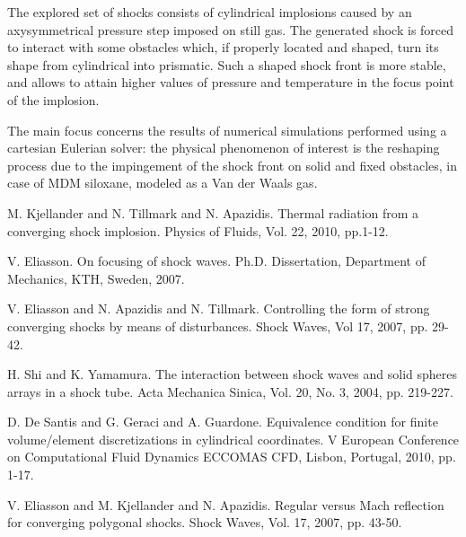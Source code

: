 \documentclass[article, A4, 11pt]{llncs}%
\begin{document}
The explored set of shocks consists of cylindrical implosions caused by an axysymmetrical pressure step imposed on still gas. The generated shock is forced to interact with some obstacles which, if properly located and shaped, turn its shape from cylindrical into prismatic. Such a shaped shock front is more stable, and allows to attain higher values of pressure and temperature in the focus point of the implosion.

The main focus concerns the results of numerical simulations performed using a cartesian Eulerian solver: the physical phenomenon of interest is the  reshaping process due to the impingement of the shock front on solid and fixed obstacles, in case of MDM siloxane, modeled as a Van der Waals gas.


\begin{thebibliography}{10}
{\sc M. Kjellander and N. Tillmark and N. Apazidis}. {Thermal radiation from a converging shock implosion}. Physics of Fluids, Vol. 22, 2010, pp.1-12.

{\sc V. Eliasson}. {On focusing of shock waves}. Ph.D. Dissertation, Department of Mechanics, KTH, Sweden, 2007.

{\sc V. Eliasson and N. Apazidis and N. Tillmark}. {Controlling the form of strong converging shocks by means of disturbances}. Shock Waves, Vol 17, 2007, pp. 29-42.

{\sc H. Shi and K. Yamamura}. {The interaction between shock waves and solid spheres arrays in a shock tube}. Acta Mechanica Sinica, Vol. 20, No. 3, 2004, pp. 219-227.

{\sc D. De Santis and G. Geraci and A. Guardone}. {Equivalence condition for finite volume/element discretizations in cylindrical coordinates}. V European Conference on Computational Fluid Dynamics ECCOMAS CFD, Lisbon, Portugal, 2010, pp. 1-17.

{\sc V. Eliasson and M. Kjellander and N. Apazidis}. {Regular versus Mach reflection for converging polygonal shocks}. Shock Waves, Vol. 17, 2007, pp. 43-50.
\end{thebibliography} %
\end{document}
